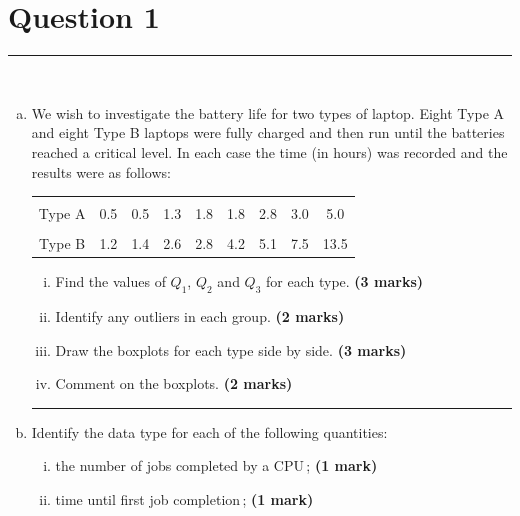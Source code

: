 \documentclass[12pt]{article}
\begin{document}
\section*{Question 1 }
\noindent\rule{\linewidth}{1pt}
\quad\\[-0.5cm]
\begin{enumerate}[a)]
\item We wish to investigate the battery life for two types of laptop. Eight Type A and eight Type B laptops were fully charged and then run until the batteries reached a critical level. In each case the time (in hours) was recorded and the results were as follows:\\[-0.6cm]
    \begin{center}
    \begin{tabular}{|c|cccccccc|}
    \hline
    &&&&&&&&\\[-0.3cm]
    Type A & 0.5 & 0.5 & 1.3 & 1.8 & 1.8 & 2.8 & 3.0 & 5.0  \\[0.1cm]
    \hline
    &&&&&&&&\\[-0.3cm]
    Type B & 1.2 & 1.4 & 2.6 & 2.8 & 4.2 & 5.1 & 7.5 & 13.5 \\[0.1cm]
    \hline
    \end{tabular}
    \end{center}
    \begin{enumerate}[i)]\itemsep0.3cm
    \item Find the values of $Q_1$, $Q_2$ and $Q_3$ for each type. \hfill{\scriptsize \bf (3 marks)}
    \item Identify any outliers in each group. \hfill{\scriptsize \bf (2 marks)}
    \item Draw the boxplots for each type side by side. \hfill{\scriptsize \bf (3 marks)}
    \item Comment on the boxplots. \hfill{\scriptsize \bf (2 marks)}
    \end{enumerate}
\begin{center}\noindent\rule{0.4\linewidth}{0.5pt}\end{center}
\item Identify the data type for each of the following quantities:
    \begin{enumerate}[i)]\itemsep0.3cm
    \item the number of jobs completed by a CPU\,; \hfill{\scriptsize \bf (1 mark)}
    \item time until first job completion\,; \hfill{\scriptsize \bf (1 mark)}

\end{enumerate}
\end{enumerate}
\end{document}
